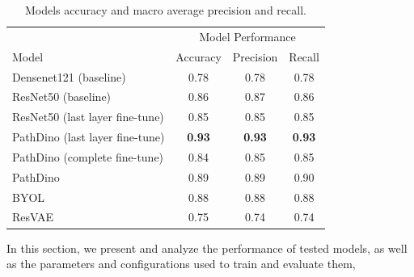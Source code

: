 \documentclass[peerreview]{IEEEtran}
\begin{document}
\begin{table}[t]
\centering
\begin{tabular}{l c c c}
\toprule
& \multicolumn{3}{c}{Model Performance} \\
\cmidrule(l){2-4}
Model & Accuracy & Precision & Recall \\
\midrule
Densenet121 (baseline) & 0.78 & 0.78 & 0.78 \\
ResNet50 (baseline) & 0.86 & 0.87 & 0.86 \\
\midrule
ResNet50 (last layer fine-tune) & 0.85 & 0.85 & 0.85 \\
PathDino (last layer fine-tune) & \textbf{0.93} & \textbf{0.93} & \textbf{0.93} \\
PathDino (complete fine-tune) & 0.84 & 0.85 & 0.85 \\
PathDino & 0.89 & 0.89 & 0.90 \\
BYOL & 0.88 & 0.88 & 0.88 \\
ResVAE & 0.75 & 0.74 & 0.74 \\
\midrule
\bottomrule
\end{tabular}
\smallskip 
\caption{\small Models accuracy and macro average precision and recall.}
\label{tab:performance}
\end{table}

\label{sec:results}
In this section, we present and analyze the performance of tested models, as well as the parameters and configurations used to train and evaluate them,
\end{document}
